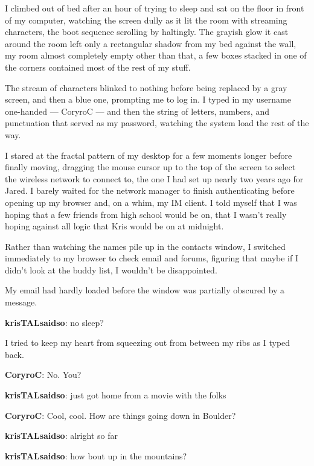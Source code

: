 I climbed out of bed after an hour of trying to sleep and sat on the floor in front of my computer, watching the screen dully as it lit the room with streaming characters, the boot sequence scrolling by haltingly.  The grayish glow it cast around the room left only a rectangular shadow from my bed against the wall, my room almost completely empty other than that, a few boxes stacked in one of the corners contained most of the rest of my stuff.

The stream of characters blinked to nothing before being replaced by a gray screen, and then a blue one, prompting me to log in.  I typed in my username one-handed --- CoryroC --- and then the string of letters, numbers, and punctuation that served as my password, watching the system load the rest of the way.

I stared at the fractal pattern of my desktop for a few moments longer before finally moving, dragging the mouse cursor up to the top of the screen to select the wireless network to connect to, the one I had set up nearly two years ago for Jared.  I barely waited for the network manager to finish authenticating before opening up my browser and, on a whim, my IM client.  I told myself that I was hoping that a few friends from high school would be on, that I wasn't really hoping against all logic that Kris would be on at midnight.

Rather than watching the names pile up in the contacts window, I switched immediately to my browser to check email and forums, figuring that maybe if I didn't look at the buddy list, I wouldn't be disappointed.

My email had hardly loaded before the window was partially obscured by a message.\vspace{1em}

\textbf{\color{red}krisTALsaidso}: no sleep?

\vspace{1em}I tried to keep my heart from squeezing out from between my ribs as I typed back.\vspace{1em}

\textbf{\color{blue}CoryroC}: No.  You?

\textbf{\color{red}krisTALsaidso}: just got home from a movie with the folks

\textbf{\color{blue}CoryroC}: Cool, cool.  How are things going down in Boulder?

\textbf{\color{red}krisTALsaidso}: alright so far

\textbf{\color{red}krisTALsaidso}: how bout up in the mountains?

